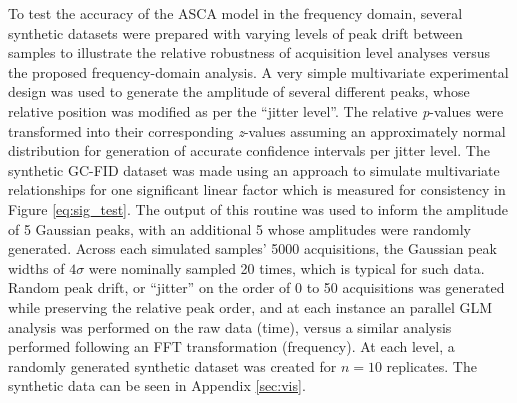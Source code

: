 \documentclass[preprint,12pt]{elsarticle}
\begin{document}
To test the accuracy of the ASCA model in the frequency domain, several synthetic datasets were prepared with varying levels of peak drift between samples to illustrate the relative robustness of acquisition level analyses versus the proposed frequency-domain analysis. A very simple multivariate experimental design was used to generate the amplitude of several different peaks, whose relative position was modified as per the ``jitter level''. The relative \textit{p}-values were transformed into their corresponding \textit{z}-values assuming an approximately normal distribution for generation of accurate confidence intervals per jitter level. The synthetic GC-FID dataset was made using an approach to simulate multivariate relationships \cite{Camacho2016} for one significant linear factor which is measured for consistency in Figure \ref{eq:sig_test}. The output of this routine was used to inform the amplitude of 5 Gaussian peaks, with an additional 5 whose amplitudes were randomly generated. Across each simulated samples' 5000 acquisitions, the Gaussian peak widths of $4\sigma$ were nominally sampled 20 times, which is typical for such data. Random peak drift, or ``jitter'' on the order of 0 to 50 acquisitions was generated while preserving the relative peak order, and at each instance an parallel GLM analysis was performed on the raw data (time), versus a similar analysis performed following an FFT transformation (frequency). At each level, a randomly generated synthetic dataset was created for $n=10$ replicates. The synthetic data can be seen in Appendix \ref{sec:vis}.
\end{document}
